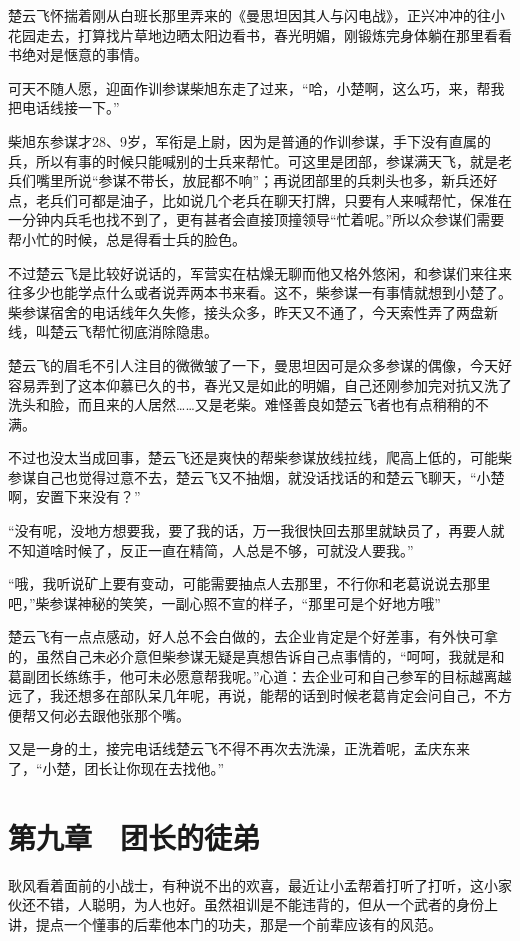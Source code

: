 楚云飞怀揣着刚从白班长那里弄来的《曼思坦因其人与闪电战》，正兴冲冲的往小花园走去，打算找片草地边晒太阳边看书，春光明媚，刚锻炼完身体躺在那里看看书绝对是惬意的事情。

可天不随人愿，迎面作训参谋柴旭东走了过来，“哈，小楚啊，这么巧，来，帮我把电话线接一下。”

柴旭东参谋才28、9岁，军衔是上尉，因为是普通的作训参谋，手下没有直属的兵，所以有事的时候只能喊别的士兵来帮忙。可这里是团部，参谋满天飞，就是老兵们嘴里所说“参谋不带长，放屁都不响”；再说团部里的兵刺头也多，新兵还好点，老兵们可都是油子，比如说几个老兵在聊天打牌，只要有人来喊帮忙，保准在一分钟内兵毛也找不到了，更有甚者会直接顶撞领导“忙着呢。”所以众参谋们需要帮小忙的时候，总是得看士兵的脸色。

不过楚云飞是比较好说话的，军营实在枯燥无聊而他又格外悠闲，和参谋们来往来往多少也能学点什么或者说弄两本书来看。这不，柴参谋一有事情就想到小楚了。柴参谋宿舍的电话线年久失修，接头众多，昨天又不通了，今天索性弄了两盘新线，叫楚云飞帮忙彻底消除隐患。

楚云飞的眉毛不引人注目的微微皱了一下，曼思坦因可是众多参谋的偶像，今天好容易弄到了这本仰慕已久的书，春光又是如此的明媚，自己还刚参加完对抗又洗了洗头和脸，而且来的人居然……又是老柴。难怪善良如楚云飞者也有点稍稍的不满。

不过也没太当成回事，楚云飞还是爽快的帮柴参谋放线拉线，爬高上低的，可能柴参谋自己也觉得过意不去，楚云飞又不抽烟，就没话找话的和楚云飞聊天，“小楚啊，安置下来没有？”

“没有呢，没地方想要我，要了我的话，万一我很快回去那里就缺员了，再要人就不知道啥时候了，反正一直在精简，人总是不够，可就没人要我。”

“哦，我听说矿上要有变动，可能需要抽点人去那里，不行你和老葛说说去那里吧，”柴参谋神秘的笑笑，一副心照不宣的样子，“那里可是个好地方哦”

楚云飞有一点点感动，好人总不会白做的，去企业肯定是个好差事，有外快可拿的，虽然自己未必介意但柴参谋无疑是真想告诉自己点事情的，“呵呵，我就是和葛副团长练练手，他可未必愿意帮我呢。”心道：去企业可和自己参军的目标越离越远了，我还想多在部队呆几年呢，再说，能帮的话到时候老葛肯定会问自己，不方便帮又何必去跟他张那个嘴。

又是一身的土，接完电话线楚云飞不得不再次去洗澡，正洗着呢，孟庆东来了，“小楚，团长让你现在去找他。”

\section{第九章　团长的徒弟}

耿风看着面前的小战士，有种说不出的欢喜，最近让小孟帮着打听了打听，这小家伙还不错，人聪明，为人也好。虽然祖训是不能违背的，但从一个武者的身份上讲，提点一个懂事的后辈他本门的功夫，那是一个前辈应该有的风范。

